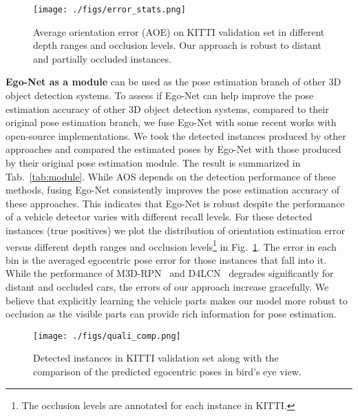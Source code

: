\documentclass[final]{cvpr}
\begin{document}
\begin{figure}
	\begin{center}
		\texttt{[image: ./figs/error\_stats.png]}
	\end{center}
	\caption{Average orientation error (AOE) on KITTI validation set in different depth ranges and occlusion levels. Our approach is robust to distant and partially occluded instances.}
	\label{fig:aoe}
\end{figure}

\noindent \textbf{Ego-Net as a module} can be used as the pose estimation branch of other 3D object detection systems. To assess if Ego-Net can help improve the pose estimation accuracy of other 3D object detection systems, compared to their original pose estimation branch, we fuse Ego-Net with some recent works with open-source implementations. We took the detected instances produced by other approaches and compared the estimated poses by Ego-Net with those produced by their original pose estimation module. The result is summarized in Tab.~\ref{tab:module}. While AOS depends on the detection performance of these methods, fusing Ego-Net consistently improves the pose estimation accuracy of these approaches. This indicates that Ego-Net is robust despite the performance of a vehicle detector varies with different recall levels. For these detected instances (true positives) we plot the distribution of orientation estimation error versus different depth ranges and occlusion levels\footnote{The occlusion levels are annotated for each instance in KITTI.} in Fig.~\ref{fig:aoe}. The error in each bin is the averaged egocentric pose error for those instances that fall into it. While the performance of M3D-RPN~\cite{brazil2019m3d} and D4LCN~\cite{Ding_2020_CVPR} degrades significantly for distant and occluded cars, the errors of our approach increase gracefully. We believe that explicitly learning the vehicle parts makes our model more robust to occlusion as the visible parts can provide rich information for pose estimation.

\begin{figure}
	\begin{center}
		\texttt{[image: ./figs/quali\_comp.png]}
	\end{center}
	\caption{Detected instances in KITTI validation set along with the comparison of the predicted egocentric poses in bird's eye view.}
	\label{fig:quali_comp}
\end{figure}
\end{document}
